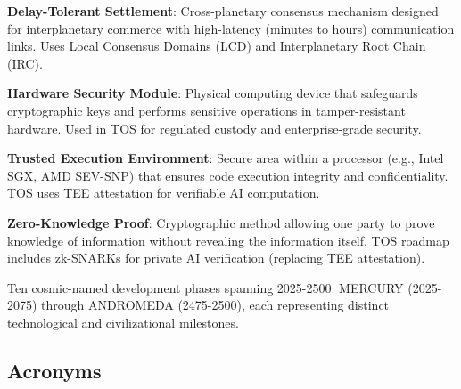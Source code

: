 \documentclass[11pt]{article}
\begin{document}
\begin{description}[leftmargin=3cm, style=nextline]
  \item[DT-Settlement] \textbf{Delay-Tolerant Settlement}: Cross-planetary consensus mechanism designed for interplanetary commerce with high-latency (minutes to hours) communication links. Uses Local Consensus Domains (LCD) and Interplanetary Root Chain (IRC).

  \item[HSM] \textbf{Hardware Security Module}: Physical computing device that safeguards cryptographic keys and performs sensitive operations in tamper-resistant hardware. Used in TOS for regulated custody and enterprise-grade security.

  \item[TEE] \textbf{Trusted Execution Environment}: Secure area within a processor (e.g., Intel SGX, AMD SEV-SNP) that ensures code execution integrity and confidentiality. TOS uses TEE attestation for verifiable AI computation.

  \item[ZK Proof] \textbf{Zero-Knowledge Proof}: Cryptographic method allowing one party to prove knowledge of information without revealing the information itself. TOS roadmap includes zk-SNARKs for private AI verification (replacing TEE attestation).

  \item[Celestial Eras] Ten cosmic-named development phases spanning 2025-2500: MERCURY (2025-2075) through ANDROMEDA (2475-2500), each representing distinct technological and civilizational milestones.
\end{description}

\subsection*{Acronyms}
\end{document}
